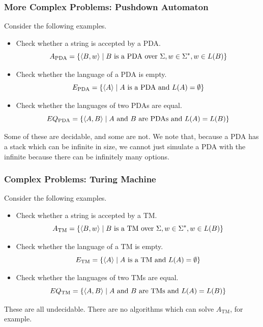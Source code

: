 \documentclass[letterpaper]{article}
\begin{document}
\subsubsection{More Complex Problems: Pushdown Automaton}
Consider the following examples.
\begin{itemize}
    \item Check whether a string is accepted by a PDA. 
    \[A_{\text{PDA}} = \{\langle B, w \rangle \mid B \text{ is a PDA over } \Sigma, w \in \Sigma^*, w \in L(B)\}\]

    \item Check whether the language of a PDA is empty. 
    \[E_{\text{PDA}} = \{\langle A \rangle \mid A \text{ is a PDA and } L(A) = \emptyset\}\]
    
    \item Check whether the languages of two PDAs are equal.
    \[EQ_{\text{PDA}} = \{\langle A, B \rangle \mid A \text{ and } B \text{ are PDAs and } L(A) = L(B)\}\]
\end{itemize}
Some of these are decidable, and some are not. We note that, because a PDA has a stack which can be infinite in size, we cannot just simulate a PDA with the infinite because there can be infinitely many options. 

\subsubsection{Complex Problems: Turing Machine}
Consider the following examples.
\begin{itemize}
    \item Check whether a string is accepted by a TM. 
    \[A_{\text{TM}} = \{\langle B, w \rangle \mid B \text{ is a TM over } \Sigma, w \in \Sigma^*, w \in L(B)\}\]

    \item Check whether the language of a TM is empty. 
    \[E_{\text{TM}} = \{\langle A \rangle \mid A \text{ is a TM and } L(A) = \emptyset\}\]
    
    \item Check whether the languages of two TMs are equal.
    \[EQ_{\text{TM}} = \{\langle A, B \rangle \mid A \text{ and } B \text{ are TMs and } L(A) = L(B)\}\]
\end{itemize}
These are all undecidable. There are no algorithms which can solve $A_{\text{TM}}$, for example.
\end{document}
